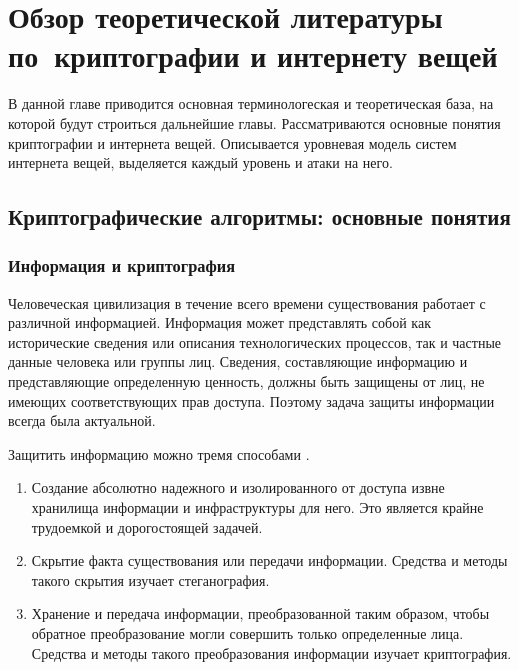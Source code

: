 \chapter{Обзор теоретической литературы по~криптографии и интернету вещей} \label{ch1}


В данной главе приводится основная терминологеская и теоретическая база, на которой будут строиться дальнейшие главы. Рассматриваются основные понятия криптографии и интернета вещей. Описывается уровневая модель систем интернета вещей, выделяется каждый уровень и атаки на него.

\section{Криптографические алгоритмы: основные понятия} \label{ch1:sec1}

\subsection{Информация и криптография} %

Человеческая цивилизация в течение всего времени существования работает с различной информацией. Информация может представлять собой как исторические сведения или описания технологических процессов, так и частные данные человека или группы лиц. Сведения, составляющие информацию и представляющие определенную ценность, должны быть защищены от лиц, не имеющих соответствующих прав доступа. Поэтому задача защиты информации всегда была актуальной. 

Защитить информацию можно тремя способами \cite{src8}.
\begin{enumerate}
	\item Создание абсолютно надежного и изолированного от доступа извне хранилища информации и инфраструктуры для него. Это является крайне трудоемкой и дорогостоящей задачей.
	\item Скрытие факта существования или передачи информации. Средства и методы такого скрытия изучает стеганография.
	\item Хранение и передача информации, преобразованной таким образом, чтобы обратное преобразование могли совершить только определенные лица. Средства и методы такого преобразования информации изучает криптография.
\end{enumerate} 

